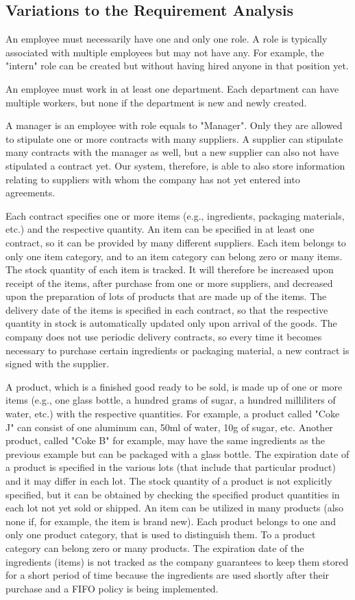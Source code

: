 \subsection{Variations to the Requirement Analysis}

An employee must necessarily have one and only one role. A role is typically associated with multiple employees but may not have any. For example, the "intern" role can be created but without having hired anyone in that position yet.

An employee must work in at least one department. Each department can have multiple workers, but none if the department is new and newly created.

A manager is an employee with role equals to "Manager". Only they are allowed  to stipulate one or more contracts with many suppliers. A supplier can stipulate many contracts with the manager as well, but a new supplier can also not have stipulated a contract yet. Our system, therefore, is able to also store information relating to suppliers with whom the company has not yet entered into agreements.

Each contract specifies one or more items (e.g., ingredients, packaging materials, etc.) and the respective quantity. An item can be specified in at least one contract, so it can be provided by many different suppliers. Each item belongs to only one item category, and to an item category can belong zero or many items. The stock quantity of each item is tracked. It will therefore be increased upon receipt of the items, after purchase from one or more suppliers, and decreased upon the preparation of lots of products that are made up of the items. The delivery date of the items is specified in each contract, so that the respective quantity in stock is automatically updated only upon arrival of the goods. The company does not use periodic delivery contracts, so every time it becomes necessary to purchase certain ingredients or packaging material, a new contract is signed with the supplier.

A product, which is a finished good ready to be sold, is made up of one or more items (e.g., one glass bottle, a hundred grams of sugar, a hundred milliliters of water, etc.) with the respective quantities. For example, a product called "Coke J" can consist of one aluminum can, 50ml of water, 10g of sugar, etc. Another product, called "Coke B" for example, may have the same ingredients as the previous example but can be packaged with a glass bottle. The expiration date of a product is specified in the various lots (that include that particular product) and it may differ in each lot. The stock quantity of a product is not explicitly specified, but it can be obtained by checking the specified product quantities in each lot not yet sold or shipped. An item can be utilized in many products (also none if, for example, the item is brand new). Each product belongs to one and only one product category, that is used to distinguish them. To a product category can belong zero or many products. The expiration date of the ingredients (items) is not tracked as the company guarantees to keep them stored for a short period of time because the ingredients are used shortly after their purchase and a FIFO policy is being implemented.

